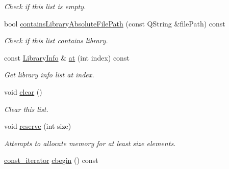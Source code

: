 \begin{DoxyCompactItemize}
\begin{DoxyCompactList}\small\item\em Check if this list is empty. \end{DoxyCompactList}\item 
bool \hyperlink{class_mdt_1_1_deploy_utils_1_1_library_info_list_a2bdcf5564dd1846be16fc5544120fe03}{contains\+Library\+Absolute\+File\+Path} (const Q\+String \&file\+Path) const \hypertarget{class_mdt_1_1_deploy_utils_1_1_library_info_list_a2bdcf5564dd1846be16fc5544120fe03}{}\label{class_mdt_1_1_deploy_utils_1_1_library_info_list_a2bdcf5564dd1846be16fc5544120fe03}

\begin{DoxyCompactList}\small\item\em Check if this list contains library. \end{DoxyCompactList}\item 
const \hyperlink{class_mdt_1_1_deploy_utils_1_1_library_info}{Library\+Info} \& \hyperlink{class_mdt_1_1_deploy_utils_1_1_library_info_list_a9c8d42963dc6318d45d90f3e63aa5569}{at} (int index) const 
\begin{DoxyCompactList}\small\item\em Get library info list at index. \end{DoxyCompactList}\item 
void \hyperlink{class_mdt_1_1_deploy_utils_1_1_library_info_list_ac6d89745bccdd70bcf08d5bbe6f9a539}{clear} ()\hypertarget{class_mdt_1_1_deploy_utils_1_1_library_info_list_ac6d89745bccdd70bcf08d5bbe6f9a539}{}\label{class_mdt_1_1_deploy_utils_1_1_library_info_list_ac6d89745bccdd70bcf08d5bbe6f9a539}

\begin{DoxyCompactList}\small\item\em Clear this list. \end{DoxyCompactList}\item 
void \hyperlink{class_mdt_1_1_deploy_utils_1_1_library_info_list_ab98b4f9f2c911281467301b4c4a485f2}{reserve} (int size)\hypertarget{class_mdt_1_1_deploy_utils_1_1_library_info_list_ab98b4f9f2c911281467301b4c4a485f2}{}\label{class_mdt_1_1_deploy_utils_1_1_library_info_list_ab98b4f9f2c911281467301b4c4a485f2}

\begin{DoxyCompactList}\small\item\em Attempts to allocate memory for at least size elements. \end{DoxyCompactList}\item 
\hyperlink{class_mdt_1_1_deploy_utils_1_1_library_info_list_a07338b20f243a1c7fcb3f696a35ddd44}{const\+\_\+iterator} \hyperlink{class_mdt_1_1_deploy_utils_1_1_library_info_list_a3e40ff4b11d26a0e2acecc7aaf78248b}{cbegin} () const \hypertarget{class_mdt_1_1_deploy_utils_1_1_library_info_list_a3e40ff4b11d26a0e2acecc7aaf78248b}{}\label{class_mdt_1_1_deploy_utils_1_1_library_info_list_a3e40ff4b11d26a0e2acecc7aaf78248b}


\end{DoxyCompactItemize}
